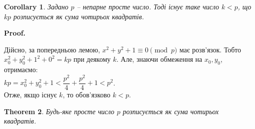 \documentclass[a4paper, 10pt]{article}
\makeatletter
\theoremstyle{theoremdd}
\newtheorem{theorem}{Theorem}[subsection]
\theoremstyle{theoremdd}
\theoremstyle{theoremdd}
\theoremstyle{theoremdd}
\theoremstyle{theoremdd}
\theoremstyle{theoremdd}
\theoremstyle{theoremdd}
\theoremstyle{theoremdd}
\newtheorem{corollary}[theorem]{Corollary}
\renewenvironment{proof}[1][Proof.\\]{\par
\pushQED{\hfill \qed}%
\normalfont \topsep6\p@\@plus6\p@\relax
\trivlist
\item\relax
{\bfseries
#1\@addpunct{.}}\hspace\labelsep\ignorespaces
}{%
\popQED\endtrivlist\@endpefalse
}
\makeatother
\begin{document}
\begin{corollary}
Задано $p$ -- непарне просте число. Тоді існує таке число $k < p$, що $kp$ розписується як сума чотирьох квадратів.
\end{corollary}

\begin{proof}
Дійсно, за попередньою лемою, $x^2+y^2+1 \equiv 0 \pmod p$ має розв'язок. Тобто $x_0^2+y_0^2+1^2+0^2 = kp$ при деякому $k$. Але, знаючи обмеження на $x_0,y_0$, отримаємо:\\
$kp = x_0^2+y_0^2+1 < \dfrac{p^2}{4} + \dfrac{p^2}{4} + 1 < p^2$.\\
Отже, якщо існує $k$, то обов'язково $k < p$.
\end{proof}

\begin{theorem}
Будь-яке просте число $p$ розписується як сума чотирьох квадратів.
\end{theorem}
\end{document}
